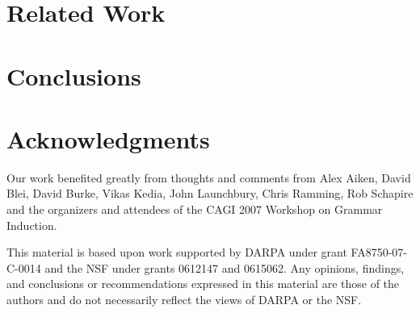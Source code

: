 \documentclass[natbib]{sigplanconf}
\begin{document}
\section{Related Work}
\label{sec:related}



\section{Conclusions}
\label{sec:conclusion}


\section*{Acknowledgments}

Our work benefited greatly from thoughts and comments from
Alex Aiken, David Blei, David Burke, Vikas Kedia, John Launchbury, Chris Ramming, 
Rob Schapire
and the organizers and attendees of the CAGI 2007 Workshop on Grammar
Induction.

This material is based upon work 
supported by DARPA under grant FA8750-07-C-0014
and the NSF
   under grants 0612147 and 0615062.
Any opinions, findings, and conclusions or recommendations
   expressed in this material are those of the authors and do not
   necessarily reflect the views of DARPA or the NSF.



%


%
\end{document}
